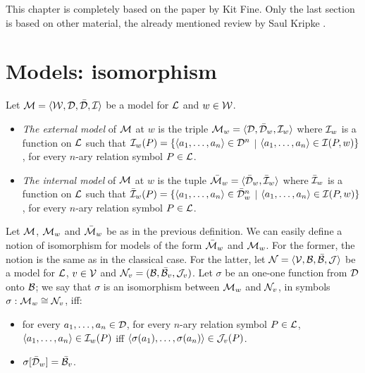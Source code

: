 \qquad This chapter is completely based on the paper \cite{Fine79} by Kit Fine. Only the last section is based on other material, the already mentioned review by Saul Kripke \cite{Kripke83}.



\section{Models: isomorphism}


\begin{defn}
Let $\mathcal{M} = \langle\mathcal{W},\mathcal{D}, \bar{\mathcal{D}},\mathcal{I}\rangle$ be a model for $\mathcal{L}$ and $w \in \mathcal{W}$.

\begin{itemize} 
\item \textit{The external model} of $\mathcal{M}$ at $w$ is the triple $ \mathcal{M}_{w} = \langle\mathcal{D}, \bar{\mathcal{D}}_{w}, \mathcal{I}_{w}\rangle$ where $\mathcal{I}_{w}$ is a function on $\mathcal{L}$ such that $\mathcal{I}_{w}(P) = \{\langle a_{1}, \dots,a_{n} \rangle \in \mathcal{D}^{n}$ $|$ $ \langle a_{1}, \dots,a_{n} \rangle \in \mathcal{I}(P,w)\}$, for every $n$-ary relation symbol $P\in \mathcal{L}$.  
\item \textit{The internal model} of $\mathcal{M}$ at $w$ is the tuple $ \bar{\mathcal{M}}_{w} = \langle\bar{\mathcal{D}}_{w}, \bar{\mathcal{I}}_{w}\rangle$ where $\bar{\mathcal{I}}_{w}$ is a function on $\mathcal{L}$ such that $\bar{\mathcal{I}}_{w}(P) = \{ \langle \textbf{}a_{1}, \dots,a_{n} \rangle \in \bar{\mathcal{D}}_{w}^{n}$ $|$ $ \langle a_{1}, \dots,a_{n} \rangle \in \mathcal{I}(P,w)\}$, for every $n$-ary relation symbol $P \in \mathcal{L}$.
\end{itemize}
\end{defn}

\begin{defn}
Let $\mathcal{M}$, $\mathcal{M}_{w}$ and $\bar{\mathcal{M}}_{w}$ be as in the previous definition. We can easily define a notion of isomorphism for models of the form $\bar{\mathcal{M}}_{w}$ and $\mathcal{M}_{w}$. For the former, the notion is the same as in the classical case. For the latter, let $\mathcal{N} = \langle\mathcal{V},\mathcal{B},\bar{\mathcal{B}},\mathcal{J}\rangle$ be a model for $\mathcal{L}$, $v \in \mathcal{V}$ and $\mathcal{N}_{v} = (\mathcal{B}, \bar{\mathcal{B}}_{v}, \mathcal{J}_{v})$. Let $\sigma$ be an one-one function from $\mathcal{D}$ onto $\mathcal{B}$; we say that $\sigma$ is an isomorphism between $\mathcal{M}_{w}$ and $\mathcal{N}_{v}$, in symbols $\sigma: \mathcal{M}_{w} \cong \mathcal{N}_{v}$,  iff:   


\begin{itemize} 
\item for every $a_{1}, \dots, a_{n} \in \mathcal{D}$, for every $n$-ary relation symbol $P \in \mathcal{L}$, $ \langle a_{1}, \dots, a_{n} \rangle \in \mathcal{I}_{w}(P)$ iff $ \langle \sigma(a_{1}), \dots, \sigma(a_{n}) \rangle \in \mathcal{J}_{v}(P)$.
\item $\sigma[\bar{\mathcal{D}}_{w}] = \bar{\mathcal{B}}_{v}$.
\end{itemize}
\end{defn}


